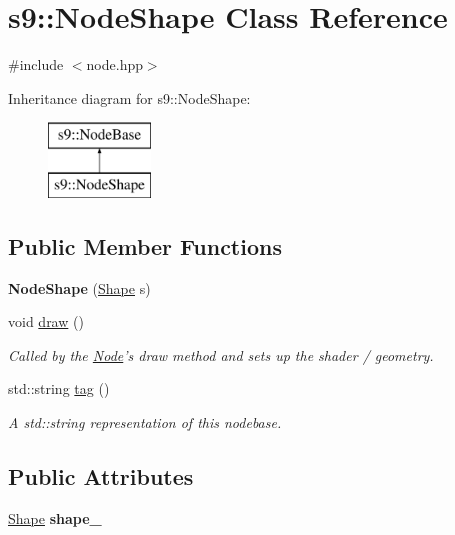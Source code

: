 \hypertarget{classs9_1_1NodeShape}{\section{s9\-:\-:Node\-Shape Class Reference}
\label{classs9_1_1NodeShape}
}


{\ttfamily \#include $<$node.\-hpp$>$}

Inheritance diagram for s9\-:\-:Node\-Shape\-:\begin{figure}[H]
\begin{center}
\leavevmode
\includegraphics[height=2.000000cm]{classs9_1_1NodeShape}
\end{center}
\end{figure}
\subsection*{Public Member Functions}
\begin{DoxyCompactItemize}
\item 
\hypertarget{classs9_1_1NodeShape_a987d3fea406e1b72fa074852ed8151eb}{{\bfseries Node\-Shape} (\hyperlink{classs9_1_1Shape}{Shape} s)}\label{classs9_1_1NodeShape_a987d3fea406e1b72fa074852ed8151eb}

\item 
void \hyperlink{classs9_1_1NodeShape_a73adf5ca86fc1aee2d4f1d4ce8c5f411}{draw} ()
\begin{DoxyCompactList}\small\item\em Called by the \hyperlink{classs9_1_1Node}{Node}'s draw method and sets up the shader / geometry. \end{DoxyCompactList}\item 
\hypertarget{classs9_1_1NodeShape_a156f017638abf3f765c422dd961ed930}{std\-::string \hyperlink{classs9_1_1NodeShape_a156f017638abf3f765c422dd961ed930}{tag} ()}\label{classs9_1_1NodeShape_a156f017638abf3f765c422dd961ed930}

\begin{DoxyCompactList}\small\item\em A std\-::string representation of this nodebase. \end{DoxyCompactList}\end{DoxyCompactItemize}
\subsection*{Public Attributes}
\begin{DoxyCompactItemize}
\item 
\hypertarget{classs9_1_1NodeShape_abd5798d93ab946ffa6e804057055bb2e}{\hyperlink{classs9_1_1Shape}{Shape} {\bfseries shape\-\_\-}}\label{classs9_1_1NodeShape_abd5798d93ab946ffa6e804057055bb2e}

\end{DoxyCompactItemize}
